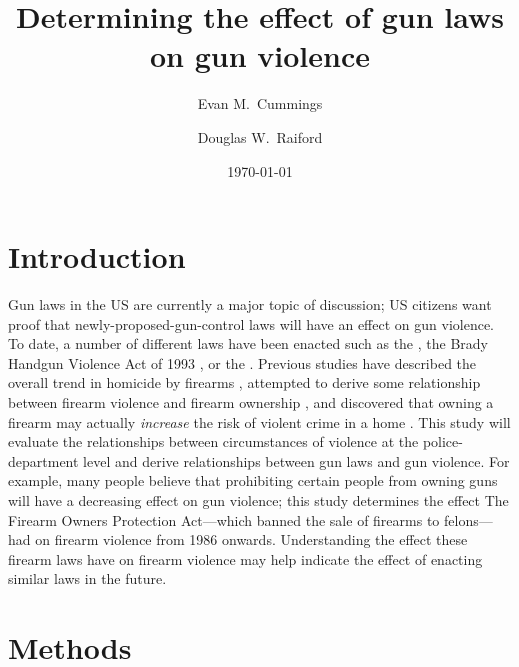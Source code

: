 \documentclass{evanarticle}
\title{Determining the effect of gun laws on gun violence}
\author{Evan M.~Cummings \and Douglas W.~Raiford}
\date{\today}
\begin{document}

\section{Introduction}

Gun laws in the US are currently a major topic of discussion; US citizens want proof that newly-proposed-gun-control laws will have an effect on gun violence.
To date, a number of different laws have been enacted such as the \cite{fopa}, the Brady Handgun Violence Act of 1993 \citep{fflra}, or the \cite{vcclea}.
Previous studies have described the overall trend in homicide by firearms \citep{cooper}, attempted to derive some relationship between firearm violence and firearm ownership \citep{swedler}, and discovered that owning a firearm may actually \emph{increase} the risk of violent crime in a home \citep{kellermann}.
This study will evaluate the relationships between circumstances of violence at the police-department level and derive relationships between gun laws and gun violence.
For example, many people believe that prohibiting certain people from owning guns will have a decreasing effect on gun violence; this study determines the effect The Firearm Owners Protection Act---which banned the sale of firearms to felons---had on firearm violence from 1986 onwards.
Understanding the effect these firearm laws have on firearm violence may help indicate the effect of enacting similar laws in the future.

\section{Methods} \label{sec_methods}
\end{document}
